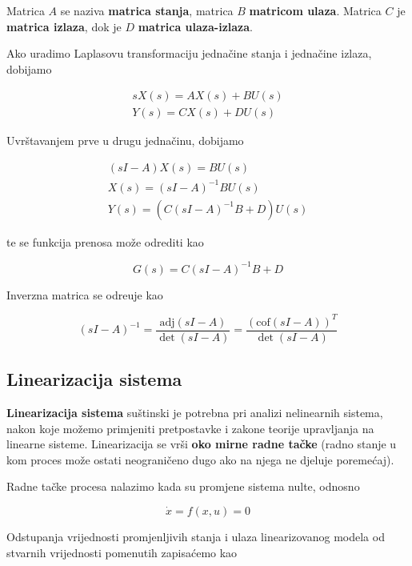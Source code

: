 \documentclass[12pt]{IEEEtran}
\numberwithin{equation}{subsection}
\numberwithin{figure}{section}
\begin{document}
Matrica $A$ se naziva \textbf{matrica stanja}, matrica $B$ \textbf{matricom ulaza}.
Matrica $C$ je \textbf{matrica izlaza}, dok je $D$ \textbf{matrica ulaza-izlaza}.

Ako uradimo Laplasovu transformaciju jedna\v{c}ine stanja i jedna\v{c}ine izlaza, dobijamo

\begin{gather}
    sX(s) = AX(s) + BU(s)\\
    Y(s) = CX(s) + DU(s)
\end{gather}

Uvr\v{s}tavanjem prve u drugu jedna\v{c}inu, dobijamo

\begin{gather}
    (sI - A)X(s) = BU(s)\\
    X(s) = (sI-A)^{-1}BU(s)\\
    Y(s) = (C(sI-A)^{-1}B + D)U(s)
\end{gather}

te se funkcija prenosa mo\v{z}e odrediti kao

\begin{equation}
    G(s) = C(sI - A)^{-1}B + D
\end{equation}

Inverzna matrica se odre\dj{}uje kao

\begin{equation}
    (sI - A)^{-1} = \frac{\text{adj}(sI - A)}{\det{(sI - A)}} = \frac{(\text{cof}(sI - A))^{T}}{\det{(sI - A)}}
\end{equation}

\subsection{\textbf{Linearizacija sistema}}
\textbf{Linearizacija sistema} su\v{s}tinski je potrebna pri analizi nelinearnih sistema,
nakon koje mo\v{z}emo primjeniti pretpostavke i zakone teorije upravljanja na linearne sisteme.
Linearizacija se vr\v{s}i \textbf{oko mirne radne ta\v{c}ke} (radno stanje
u kom proces mo\v{z}e ostati neograni\v{c}eno dugo ako na njega ne
djeluje poreme\'{c}aj).

Radne ta\v{c}ke procesa nalazimo kada su promjene sistema nulte, odnosno

\begin{equation}
    \dot{x} = f(x, u) = 0
\end{equation}

Odstupanja vrijednosti promjenljivih stanja i ulaza linearizovanog modela
od stvarnih vrijednosti pomenutih zapisa\'{c}emo kao
\end{document}
